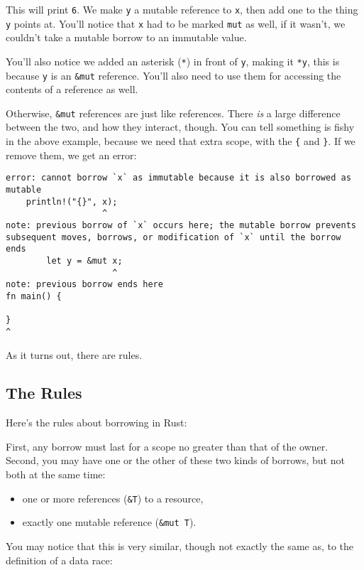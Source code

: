 \documentclass[a4paper,]{book}
\providecommand{\tightlist}{%
  \setlength{\itemsep}{0pt}\setlength{\parskip}{0pt}}
\begin{document}
This will print \texttt{6}. We make \texttt{y} a mutable reference to
\texttt{x}, then add one to the thing \texttt{y} points at. You'll
notice that \texttt{x} had to be marked \texttt{mut} as well, if it
wasn't, we couldn't take a mutable borrow to an immutable value.

You'll also notice we added an asterisk (\texttt{*}) in front of
\texttt{y}, making it \texttt{*y}, this is because \texttt{y} is an
\texttt{\&mut} reference. You'll also need to use them for accessing the
contents of a reference as well.

Otherwise, \texttt{\&mut} references are just like references. There
\emph{is} a large difference between the two, and how they interact,
though. You can tell something is fishy in the above example, because we
need that extra scope, with the \texttt{\{} and \texttt{\}}. If we
remove them, we get an error:

\begin{verbatim}
error: cannot borrow `x` as immutable because it is also borrowed as mutable
    println!("{}", x);
                   ^
note: previous borrow of `x` occurs here; the mutable borrow prevents
subsequent moves, borrows, or modification of `x` until the borrow ends
        let y = &mut x;
                     ^
note: previous borrow ends here
fn main() {

}
^
\end{verbatim}

As it turns out, there are rules.

\subsection{The Rules}\label{the-rules}

Here's the rules about borrowing in Rust:

First, any borrow must last for a scope no greater than that of the
owner. Second, you may have one or the other of these two kinds of
borrows, but not both at the same time:

\begin{itemize}
\tightlist
\item
  one or more references (\texttt{\&T}) to a resource,
\item
  exactly one mutable reference (\texttt{\&mut\ T}).
\end{itemize}

You may notice that this is very similar, though not exactly the same
as, to the definition of a data race:
\end{document}
